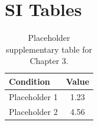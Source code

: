 \section{SI Tables}

\begin{table}[htbp]
  \centering
  \caption{Placeholder supplementary table for Chapter 3.}
  \label{tab:ch3-si-table1}
  \begin{tabular}{lc}
    \toprule
    Condition & Value \\
    \midrule
    Placeholder 1 & 1.23 \\
    Placeholder 2 & 4.56 \\
    \bottomrule
  \end{tabular}
\end{table}
